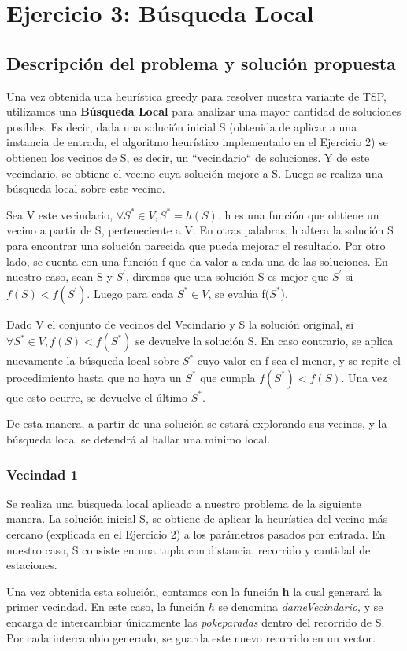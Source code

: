 \section{Ejercicio 3: Búsqueda Local}
    \subsection{Descripción del problema y solución propuesta}

    \par Una vez obtenida una heurística greedy para resolver nuestra variante de TSP, utilizamos una \textbf{Búsqueda Local} para analizar una mayor cantidad de soluciones posibles. Es decir, dada una solución inicial S (obtenida de aplicar a una instancia de entrada, el algoritmo heurístico implementado en el Ejercicio 2) se obtienen los vecinos de S, es decir, un “vecindario“ de soluciones. Y de este vecindario, se obtiene el vecino cuya solución mejore a S. Luego se realiza una búsqueda local sobre este vecino. 
    \par Sea V este vecindario, $\forall S^{*}\in V, S^{*} = h(S)$. h es una función que obtiene un vecino a partir de S, perteneciente a V. En otras palabras, h altera la solución S para encontrar una solución parecida que pueda mejorar el resultado. Por otro lado, se cuenta con una función f que da valor a cada una de las soluciones. En nuestro caso, sean S y $S^{'}$, diremos que una solución S es mejor que $S^{'}$ si $f(S) < f(S^{'})$. Luego para cada $S^{*}\in V$, se evalúa f($S^{*}$). 
    \par Dado V el conjunto de vecinos del Vecindario y S la solución original, si $\forall S^{*}\in V, f(S) < f(S^{*})$  se devuelve la solución S. En caso contrario, se aplica nuevamente la búsqueda local sobre $S^{*}$ cuyo valor en f sea el menor, y se repite el procedimiento hasta que no haya un $S^{*}$ que cumpla $f(S^{*}) < f(S)$. Una vez que esto ocurre, se devuelve el último $S^{*}$. 
    \par De esta manera, a partir de una solución se estará explorando sus vecinos, y la búsqueda local se detendrá al hallar una mínimo local.

    \subsubsection{Vecindad 1}

    \par Se realiza una búsqueda local aplicado a nuestro problema de la siguiente manera. La solución inicial S, se obtiene de aplicar la heurística del vecino más cercano (explicada en el Ejercicio 2) a los parámetros pasados por entrada. En nuestro caso, S consiste en una tupla con distancia, recorrido y cantidad de estaciones.
    \par Una vez obtenida esta solución, contamos con la función \textbf{h} la cual generará la primer vecindad. En este caso, la función $h$ se denomina \emph{dameVecindario}, y se encarga de intercambiar únicamente las \emph{pokeparadas} dentro del recorrido de S. Por cada intercambio generado, se guarda este nuevo recorrido en un vector.

